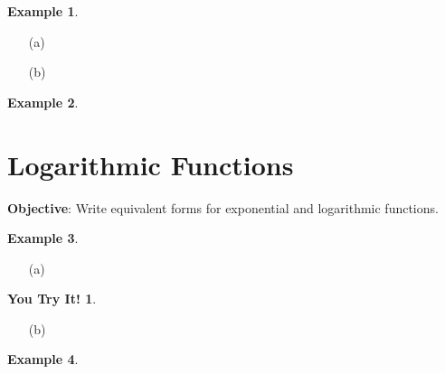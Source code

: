 \documentclass{report}
\theoremstyle{definition}
\newtheorem{example}{\bf Example}
\newtheorem{youtry}{\bf You Try It!}
\begin{document}
\vfill

\begin{example}

\end{example}
\begin{minipage}[t]{0.45\linewidth}
	\begin{itemize}
		\item[(a)] 
	\end{itemize}
\end{minipage}
\begin{minipage}[t]{0.45\linewidth}
	\begin{itemize}
		\item[(b)] 
	\end{itemize}
\end{minipage}
\vfill

\begin{example}

\end{example}

\vfill



 \noindent{}
 \newpage

 \section{ Logarithmic Functions  }
  \indent\hfill\small\noindent \textbf{Objective}: Write equivalent forms for exponential and logarithmic functions. \normalsize\\
 \setcounter{example}{0}
 \setcounter{definition}{0}
 
\hspace{-0.5cm}\begin{minipage}[t]{0.45\linewidth}
	 \begin{example}

	 \end{example}
	 \begin{itemize}
	 	\item[(a)] 
	 \end{itemize}
\end{minipage}
\hspace{1.25cm}
 \begin{minipage}[t]{0.45\linewidth}
 	 \begin{youtry}

 	 \end{youtry}
	 \begin{itemize}
	 	\item[(b)]
	 \end{itemize}
\end{minipage}
 \vfill
 \begin{example}

 \end{example}
 
\end{document}
